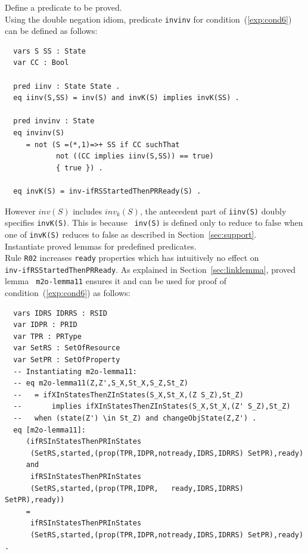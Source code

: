 \documentclass[12pt]{report}
\newcommand{\stt}[1]{{\small{\tt {#1}}}}
\begin{document}
 Define a predicate to be proved. \\ Using the
double negation idiom, predicate {\tt invinv} for
condition~(\ref{exp:cond6}) can be defined as follows:
\small
\begin{verbatim}
  vars S SS : State
  var CC : Bool

  pred iinv : State State .
  eq iinv(S,SS) = inv(S) and invK(S) implies invK(SS) .

  pred invinv : State
  eq invinv(S)
     = not (S =(*,1)=>+ SS if CC suchThat
            not ((CC implies iinv(S,SS)) == true)
            { true }) .

  eq invK(S) = inv-ifRSStartedThenPRReady(S) .
\end{verbatim}
\normalsize
However $inv(S)$ includes $inv_k(S)$, the antecedent part of
\stt{iinv(S)} doubly specifies \stt{invK(S)}. This is because {\tt
  inv(S)} is defined only to reduce to false when one of {\tt invK(S)}
reduces to false as described in Section~\ref{sec:support}.\\

 Instantiate proved lemmas for predefined
predicates. \\ Rule {\tt R02} increases {\tt ready} properties which
has intuitively no effect on \\ {\tt inv-ifRSStartedThenPRReady}. As
explained in Section~\ref{sec:linklemma}, proved lemma {\tt
  m2o-lemma11} ensures it and can be used for proof of
condition~(\ref{exp:cond6}) as follows:
\small
\begin{verbatim}
  vars IDRS IDRRS : RSID 
  var IDPR : PRID
  var TPR : PRType
  var SetRS : SetOfResource
  var SetPR : SetOfProperty
  -- Instantiating m2o-lemma11:
  -- eq m2o-lemma11(Z,Z',S_X,St_X,S_Z,St_Z)
  --   = ifXInStatesThenZInStates(S_X,St_X,(Z S_Z),St_Z)
  --       implies ifXInStatesThenZInStates(S_X,St_X,(Z' S_Z),St_Z) 
  --   when (state(Z') \in St_Z) and changeObjState(Z,Z') .
  eq [m2o-lemma11]:
     (ifRSInStatesThenPRInStates
      (SetRS,started,(prop(TPR,IDPR,notready,IDRS,IDRRS) SetPR),ready)
     and
      ifRSInStatesThenPRInStates
      (SetRS,started,(prop(TPR,IDPR,   ready,IDRS,IDRRS) SetPR),ready))
     = 
      ifRSInStatesThenPRInStates
      (SetRS,started,(prop(TPR,IDPR,notready,IDRS,IDRRS) SetPR),ready) .
\end{verbatim}
\normalsize
\end{document}
